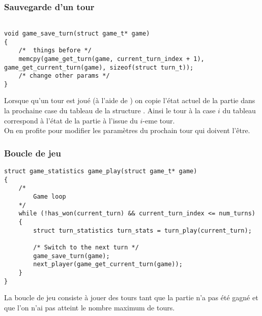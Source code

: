 \subsubsection{Sauvegarde d'un tour}


\begin{lstlisting}[frame=single, caption={Sauvegarde d'un tour}, label=save]

void game_save_turn(struct game_t* game)
{
    /*  things before */
	memcpy(game_get_turn(game, current_turn_index + 1), game_get_current_turn(game), sizeof(struct turn_t));	
    /* change other params */
}
\end{lstlisting}

Lorsque qu'un tour est joué (à l'aide de ) on copie l'état actuel de la partie dans la prochaine case du tableau  de la structure . Ainsi le tour à la case $i$ du tableau correspond à l'état de la partie à l'issue du $i$-eme tour. \\
On en profite pour modifier les paramètres du prochain tour qui doivent l'être.

\subsubsection{Boucle de jeu}

\begin{lstlisting}[frame=single, caption={Implémentation de la boucle de jeu}]
struct game_statistics game_play(struct game_t* game)
{
    /*
        Game loop
    */
    while (!has_won(current_turn) && current_turn_index <= num_turns)
    {
        struct turn_statistics turn_stats = turn_play(current_turn);
    
        /* Switch to the next turn */
        game_save_turn(game);
        next_player(game_get_current_turn(game));
    }
}
\end{lstlisting}

La boucle de jeu consiste à jouer des tours tant que la partie n'a pas été gagné et que l'on n'ai pas atteint le nombre maximum de tours.